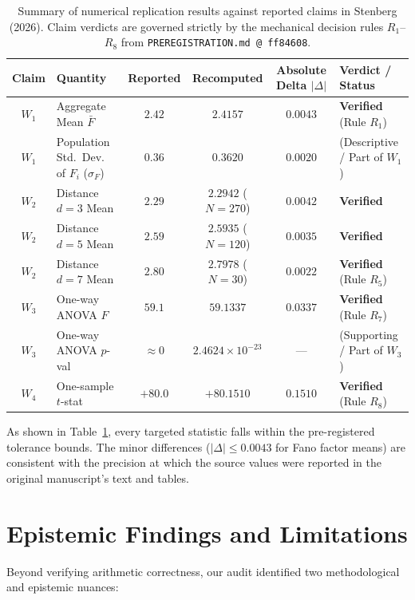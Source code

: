 \begin{table}[htbp]
\centering
\footnotesize
\setlength{\tabcolsep}{3pt}
\begin{tabularx}{\linewidth}{|c|l|c|c|c|X|}
\hline
\textbf{Claim} & \textbf{Quantity} & \textbf{Reported} & \textbf{Recomputed} & \textbf{Absolute Delta $|\Delta|$} & \textbf{Verdict / Status} \\
\hline
$W_1$ & Aggregate Mean $\bar{F}$ & $2.42$ & $2.4157$ & $0.0043$ & \textbf{Verified} (Rule $R_1$) \\
$W_1$ & Population Std.~Dev. of $F_i$ ($\sigma_F$) & $0.36$ & $0.3620$ & $0.0020$ & (Descriptive / Part of $W_1$) \\
\hline
$W_2$ & Distance $d=3$ Mean & $2.29$ & $2.2942$ ($N=270$) & $0.0042$ & \textbf{Verified} \\
$W_2$ & Distance $d=5$ Mean & $2.59$ & $2.5935$ ($N=120$) & $0.0035$ & \textbf{Verified} \\
$W_2$ & Distance $d=7$ Mean & $2.80$ & $2.7978$ ($N=30$) & $0.0022$ & \textbf{Verified} (Rule $R_5$) \\
\hline
$W_3$ & One-way ANOVA $F$ & $59.1$ & $59.1337$ & $0.0337$ & \textbf{Verified} (Rule $R_7$) \\
$W_3$ & One-way ANOVA $p$-val & $\approx 0$ & $2.4624 \times 10^{-23}$ & --- & (Supporting / Part of $W_3$) \\
\hline
$W_4$ & One-sample $t$-stat & $+80.0$ & $+80.1510$ & $0.1510$ & \textbf{Verified} (Rule $R_8$) \\
\hline
\end{tabularx}
\caption{Summary of numerical replication results against reported claims in Stenberg (2026). Claim verdicts are governed strictly by the mechanical decision rules $R_1$–$R_8$ from \texttt{PREREGISTRATION.md @ ff84608}.}
\label{tab:results}
\end{table}

As shown in Table~\ref{tab:results}, every targeted statistic falls within the pre-registered tolerance bounds. The minor differences ($|\Delta| \le 0.0043$ for Fano factor means) are consistent with the precision at which the source values were reported in the original manuscript's text and tables.

\section{Epistemic Findings and Limitations}

Beyond verifying arithmetic correctness, our audit identified two methodological and epistemic nuances:

